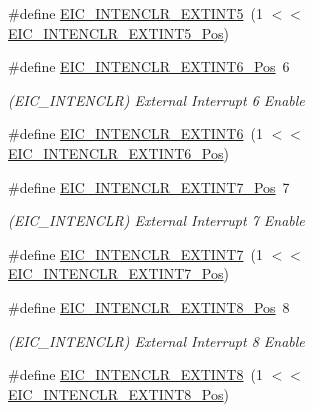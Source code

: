 \begin{DoxyCompactItemize}
\#define \mbox{\hyperlink{group___s_a_m_d21___e_i_c_gad4d32b983f7233ad20785e6c5ee9184f}{E\+I\+C\+\_\+\+I\+N\+T\+E\+N\+C\+L\+R\+\_\+\+E\+X\+T\+I\+N\+T5}}~(1 $<$$<$ \mbox{\hyperlink{group___s_a_m_d21___e_i_c_ga6efdef00445de6a92d44450ed56bc9e3}{E\+I\+C\+\_\+\+I\+N\+T\+E\+N\+C\+L\+R\+\_\+\+E\+X\+T\+I\+N\+T5\+\_\+\+Pos}})
\item 
\#define \mbox{\hyperlink{group___s_a_m_d21___e_i_c_gac7cac9c81b62ffa17527510350bca8da}{E\+I\+C\+\_\+\+I\+N\+T\+E\+N\+C\+L\+R\+\_\+\+E\+X\+T\+I\+N\+T6\+\_\+\+Pos}}~6
\begin{DoxyCompactList}\small\item\em (E\+I\+C\+\_\+\+I\+N\+T\+E\+N\+C\+LR) External Interrupt 6 Enable \end{DoxyCompactList}\item 
\#define \mbox{\hyperlink{group___s_a_m_d21___e_i_c_ga0bd9985e154a2bce79c5561f99a0744b}{E\+I\+C\+\_\+\+I\+N\+T\+E\+N\+C\+L\+R\+\_\+\+E\+X\+T\+I\+N\+T6}}~(1 $<$$<$ \mbox{\hyperlink{group___s_a_m_d21___e_i_c_gac7cac9c81b62ffa17527510350bca8da}{E\+I\+C\+\_\+\+I\+N\+T\+E\+N\+C\+L\+R\+\_\+\+E\+X\+T\+I\+N\+T6\+\_\+\+Pos}})
\item 
\#define \mbox{\hyperlink{group___s_a_m_d21___e_i_c_ga56d3350d7a42ffaa65f8c7109aaebcde}{E\+I\+C\+\_\+\+I\+N\+T\+E\+N\+C\+L\+R\+\_\+\+E\+X\+T\+I\+N\+T7\+\_\+\+Pos}}~7
\begin{DoxyCompactList}\small\item\em (E\+I\+C\+\_\+\+I\+N\+T\+E\+N\+C\+LR) External Interrupt 7 Enable \end{DoxyCompactList}\item 
\#define \mbox{\hyperlink{group___s_a_m_d21___e_i_c_gafe8502c78f05d6e05d77c56890c819b2}{E\+I\+C\+\_\+\+I\+N\+T\+E\+N\+C\+L\+R\+\_\+\+E\+X\+T\+I\+N\+T7}}~(1 $<$$<$ \mbox{\hyperlink{group___s_a_m_d21___e_i_c_ga56d3350d7a42ffaa65f8c7109aaebcde}{E\+I\+C\+\_\+\+I\+N\+T\+E\+N\+C\+L\+R\+\_\+\+E\+X\+T\+I\+N\+T7\+\_\+\+Pos}})
\item 
\#define \mbox{\hyperlink{group___s_a_m_d21___e_i_c_gaab987f75db9c2846a65dd7696387b806}{E\+I\+C\+\_\+\+I\+N\+T\+E\+N\+C\+L\+R\+\_\+\+E\+X\+T\+I\+N\+T8\+\_\+\+Pos}}~8
\begin{DoxyCompactList}\small\item\em (E\+I\+C\+\_\+\+I\+N\+T\+E\+N\+C\+LR) External Interrupt 8 Enable \end{DoxyCompactList}\item 
\#define \mbox{\hyperlink{group___s_a_m_d21___e_i_c_ga4ca0406faeec49bc366b9a31bfff386a}{E\+I\+C\+\_\+\+I\+N\+T\+E\+N\+C\+L\+R\+\_\+\+E\+X\+T\+I\+N\+T8}}~(1 $<$$<$ \mbox{\hyperlink{group___s_a_m_d21___e_i_c_gaab987f75db9c2846a65dd7696387b806}{E\+I\+C\+\_\+\+I\+N\+T\+E\+N\+C\+L\+R\+\_\+\+E\+X\+T\+I\+N\+T8\+\_\+\+Pos}})

\end{DoxyCompactItemize}
